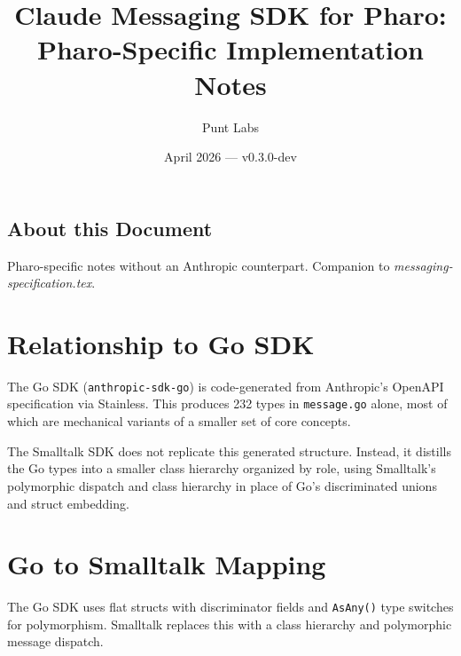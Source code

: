 \documentclass[a4paper,10pt,fleqn]{article}
\begin{document}
\title{Claude Messaging SDK for Pharo:\\Pharo-Specific Implementation Notes}
\author{Punt Labs}
\date{April 2026 --- v0.3.0-dev}
\maketitle

\tableofcontents
\newpage

\subsection*{About this Document}

Pharo-specific notes without an Anthropic counterpart.  Companion
to \emph{messaging-specification.tex}.

\section{Relationship to Go SDK}

The Go SDK (\texttt{anthropic-sdk-go}) is code-generated from Anthropic's
OpenAPI specification via Stainless.  This produces 232 types in
\texttt{message.go} alone, most of which are mechanical variants of a
smaller set of core concepts.

The Smalltalk SDK does not replicate this generated structure.  Instead, it
distills the Go types into a smaller class hierarchy organized by role,
using Smalltalk's polymorphic dispatch and class hierarchy in place of Go's
discriminated unions and struct embedding.

\section{Go to Smalltalk Mapping}

The Go SDK uses flat structs with discriminator fields and \texttt{AsAny()}
type switches for polymorphism.  Smalltalk replaces this with a class
hierarchy and polymorphic message dispatch.
\end{document}

